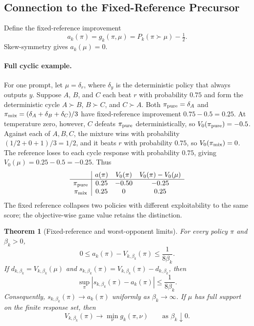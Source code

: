\documentclass{article}
\newtheorem{theorem}{Theorem}
\theoremstyle{remark}
\theoremstyle{plain}
\begin{document}
\subsection{Connection to the Fixed-Reference Precursor}
\label{app:anchor-limit}
Define the fixed-reference improvement
\begin{equation}
a_k(\pi)=g_k(\pi,\mu)=P_k(\pi\succ\mu)-\tfrac12.
\label{eq:anchor-margin}
\end{equation}
Skew-symmetry gives $a_k(\mu)=0$.

\paragraph{Full cyclic example.}
For one prompt, let $\mu=\delta_r$, where $\delta_y$ is the deterministic policy that always outputs $y$. Suppose $A$, $B$, and $C$ each beat $r$ with probability $0.75$ and form the deterministic cycle $A\succ B$, $B\succ C$, and $C\succ A$. Both $\pi_{\rm pure}=\delta_A$ and $\pi_{\rm mix}=(\delta_A+\delta_B+\delta_C)/3$ have fixed-reference improvement $0.75-0.5=0.25$. At temperature zero, however, $C$ defeats $\pi_{\rm pure}$ deterministically, so $V_0(\pi_{\rm pure})=-0.5$. Against each of $A,B,C$, the mixture wins with probability $(1/2+0+1)/3=1/2$, and it beats $r$ with probability $0.75$, so $V_0(\pi_{\rm mix})=0$. The reference loses to each cycle response with probability $0.75$, giving $V_0(\mu)=0.25-0.5=-0.25$. Thus
\[
\begin{array}{c|ccc}
 & a(\pi) & V_0(\pi) & V_0(\pi)-V_0(\mu)\\
\hline
\pi_{\rm pure} & 0.25 & -0.50 & -0.25\\
\pi_{\rm mix}  & 0.25 &  0    &  0.25
\end{array}
\]
The fixed reference collapses two policies with different exploitability to the same score; the objective-wise game value retains the distinction.

\begin{theorem}[Fixed-reference and worst-opponent limits]
\label{thm:limits}
For every policy $\pi$ and $\beta_k>0$,
\begin{equation}
0\le a_k(\pi)-V_{k,\beta_k}(\pi)\le\frac{1}{8\beta_k}.
\label{eq:value-anchor-bound}
\end{equation}
If $d_{k,\beta_k}=V_{k,\beta_k}(\mu)$ and $s_{k,\beta_k}(\pi)=V_{k,\beta_k}(\pi)-d_{k,\beta_k}$, then
\begin{equation}
\sup_{\pi}\left|s_{k,\beta_k}(\pi)-a_k(\pi)\right|
\le\frac{1}{8\beta_k}.
\label{eq:surplus-anchor-bound}
\end{equation}
Consequently, $s_{k,\beta_k}(\pi)\to a_k(\pi)$ uniformly as $\beta_k\to\infty$. If $\mu$ has full support on the finite response set, then
\begin{equation}
V_{k,\beta_k}(\pi)\longrightarrow\min_\nu g_k(\pi,\nu)
\qquad\text{as }\beta_k\downarrow0.
\label{eq:worst-opponent-limit}
\end{equation}
\end{theorem}
\end{document}
